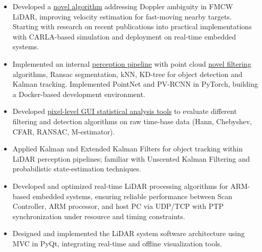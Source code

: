 \vspace{-1em}
\begin{itemize}[leftmargin=*]

\item Developed a {\fontsize{10pt}{10pt}\selectfont\textcolor{blocktext2_color}{\href{https://amr-aboughazala.super.site/doppler-ambiguity-solution}{novel algorithm}}} addressing Doppler ambiguity in FMCW LiDAR, improving velocity estimation for fast-moving nearby targets. Starting with research on recent publications into practical implementations with CARLA-based simulation and deployment on real-time embedded systems.


\vspace{0.2em}

\item Implemented an internal {\fontsize{10pt}{10pt}\selectfont\textcolor{blocktext2_color}{\href{https://amr-aboughazala.super.site/perception}{perception pipeline}}} with point cloud {\fontsize{10pt}{10pt}\selectfont\textcolor{blocktext2_color}{\href{https://amr-aboughazala.super.site/real-time-filtering}{novel filtering}}} algorithms, Ransac segmentation, kNN, KD-tree for object detection and Kalman tracking. Implemented PointNet and PV-RCNN in PyTorch, building a Docker-based development environment.


\vspace{0.2em}

\item Developed \href{https://amr-aboughazala.super.site/data-analysis}{pixel-level GUI statistical analysis tools} to evaluate different filtering and detection algorithms on raw time-base data (Hann, Chebyshev, CFAR, RANSAC, M-estimator).

\vspace{0.2em}

\item Applied Kalman and Extended Kalman Filters for object tracking within LiDAR perception pipelines; familiar with Unscented Kalman Filtering and probabilistic state-estimation techniques.

\vspace{0.2em}

\item Developed and optimized real-time LiDAR processing algorithms for ARM-based embedded systems, ensuring reliable performance between Scan Controller, ARM processor, and host PC via UDP/TCP with PTP synchronization under resource and timing constraints.

\vspace{0.2em}

\item Designed and implemented the LiDAR system software architecture using MVC in PyQt, integrating real-time and offline visualization tools.


\end{itemize}                               
                
